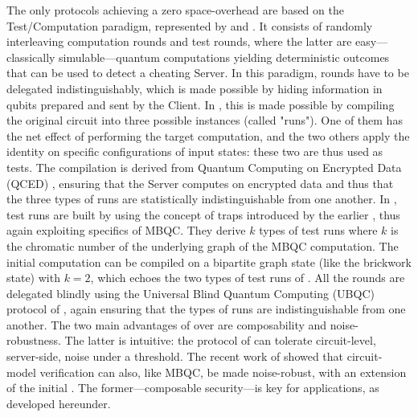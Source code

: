 The only protocols achieving a zero space-overhead are based on the Test/Computation paradigm, represented by \cite{B18how} and \cite{LMKO21verifying}.
It consists of randomly interleaving computation rounds and test rounds, where the latter are easy---classically simulable---quantum computations yielding deterministic outcomes that can be used to detect a cheating Server. In this paradigm, rounds have to be delegated indistinguishably, which is made possible by hiding information in qubits prepared and sent by the Client. In \cite{B18how}, this is made possible by compiling the original circuit into three possible instances (called "runs"). One of them has the net effect of performing the target computation, and the two others apply the identity on specific configurations of input states: these two are thus used as tests. The compilation is derived from Quantum Computing on Encrypted Data (QCED) \cite{B15delegating}, ensuring that the Server computes on encrypted data and thus that the three types of runs are statistically indistinguishable from one another.
In \cite{LMKO21verifying}, test runs are built by using the concept of traps introduced by the earlier \cite{FK17unconditionally}, thus again exploiting specifics of MBQC. They derive $k$ types of test runs where $k$ is the chromatic number of the underlying graph of the MBQC computation. The initial computation can be compiled on a bipartite graph state (like the brickwork state) with $k=2$, which echoes the two types of test runs of \cite{B18how}. All the rounds are delegated blindly using the Universal Blind Quantum Computing (UBQC) protocol of \cite{BFK09universal}, again ensuring that the types of runs are indistinguishable from one another. The two main advantages of \cite{LMKO21verifying} over \cite{B18how} are
composability and noise-robustness. The latter is intuitive: the protocol of \cite{LMKO21verifying} can tolerate circuit-level, server-side, noise under a threshold. The recent work of \cite{BN25noise} showed that circuit-model verification can also, like MBQC, be made noise-robust, with an extension of the initial \cite{B18how}. The former—composable security—is key for applications, as developed hereunder.

